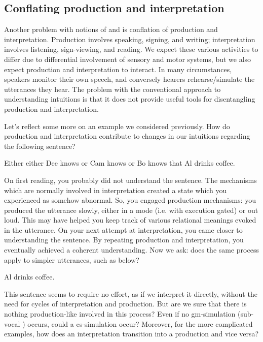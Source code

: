 \subsection{Conflating production and interpretation}

Another problem with notions of  and  is conflation of production and interpretation. Production involves speaking, signing, and writing; interpretation involves listening, sign-viewing, and reading. We expect these various activities to differ due to differential involvement of sensory and motor systems, but we also expect production and interpretation to interact. In many circumstances, speakers monitor their own speech, and conversely hearers rehearse/simulate the utterances they hear. The problem with the conventional approach to understanding intuitions is that it does not provide useful tools for disentangling production and interpretation.

  Let's reflect some more on an example we considered previously. How do production and interpretation contribute to changes in our intuitions regarding the following sentence? 

\ea
Either either Dee knows or Cam knows or Bo knows that Al drinks coffee.
\z

  On first reading, you probably did not understand the sentence. The mechanisms which are normally involved in interpretation created a state which you experienced as somehow abnormal. So, you engaged production mechanisms: you produced the utterance slowly, either in a  mode (i.e. with execution gated) or out loud. This may have helped you keep track of various relational meanings evoked in the utterance. On your next attempt at interpretation, you came closer to understanding the sentence. By repeating production and interpretation, you eventually achieved a coherent understanding. Now we ask: does the same process apply to simpler utterances, such as below?

\ea
Al drinks coffee.
\z

  This sentence seems to require no effort, as if we interpret it directly, without the need for cycles of interpretation and production. But are we sure that there is nothing production-like involved in this process? Even if no gm-simulation (sub-vocal ) occurs, could a cs-simulation occur? Moreover, for the more complicated examples, how does an interpretation transition into a production and vice versa?

